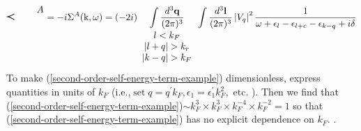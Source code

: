 \begin{equation}
\begin{aligned}
\begin{tikzpicture}[x=0.65pt,y=0.65pt,yscale=-1,xscale=1]
\draw [shift={(384.57,61.11)}, rotate = 0] [color={rgb, 255:red, 0; green, 0; blue, 0 }  ][line width=0.75]    (10.93,-4.9) .. controls (6.95,-2.3) and (3.31,-0.67) .. (0,0) .. controls (3.31,0.67) and (6.95,2.3) .. (10.93,4.9)   ;

\draw (431,42) node [anchor=north west][inner sep=0.75pt]    {$A$};


\end{tikzpicture}=-i \Sigma^{A}(\mathrm{k}, \omega)=(-2 i) \underset{\begin{array}{c}
l<k_{F} \\
|l+q|>k_{r} \\
|k-q|>k_{F}
\end{array}}{\int \frac{d^{3} \mathbf{q}}{(2 \pi)^{3}}} \int \frac{d^{3} \mathbf{l}}{(2 \pi)^{3}}\left|V_{q}\right|^{2} \frac{1}{\omega+\epsilon_{l}-\epsilon_{l+c}-\epsilon_{k-q}+i \delta}
    \end{aligned}
\label{second-order-self-energy-term-example}
\end{equation}
To make (\ref{second-order-self-energy-term-example}) dimensionless, express quantities in units of $k_F$ (i.e.,$\operatorname{set} q=q^{\prime} k_{F}, \epsilon_{1}=\epsilon_{1}^{\prime} k_{F}^{2}, \text { etc. }$). Then we find that (\ref{second-order-self-energy-term-example})$\sim k_{F}^{3} \times k_{F}^{3} \times k_{F}^{-4} \times k_F^{-2}=1$ so that (\ref{second-order-self-energy-term-example}) has no explicit dependence on $k_F$. .

